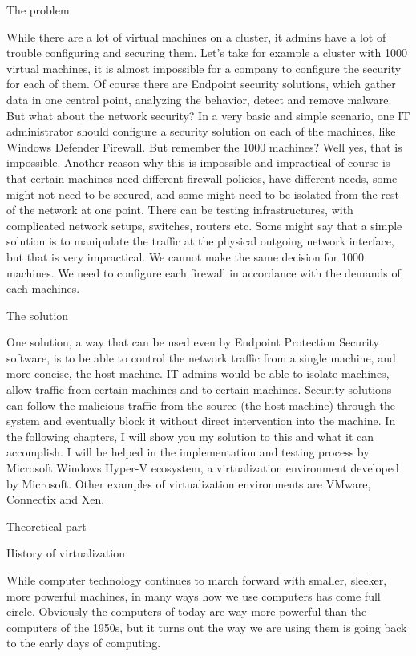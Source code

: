 \documentclass[a4paper,12pt]{report}
\begin{document}
The problem

While there are a lot of virtual machines on a cluster, it admins have a lot of trouble configuring and securing them. Let’s take for example a cluster with 1000 virtual machines, it is almost impossible for a company to configure the security for each of them. Of course there are Endpoint security solutions, which gather data in one central point, analyzing the behavior, detect and remove malware. 
But what about the network security? 
In a very basic and simple scenario, one IT administrator should configure a security solution on each of the machines, like Windows Defender Firewall. But remember the 1000 machines? Well yes, that is impossible. Another reason why this is impossible and impractical of course is that certain machines need different firewall policies, have different needs, some might not need to be secured, and some might need to be isolated from the rest of the network at one point. There can be testing infrastructures, with complicated network setups, switches, routers etc. 
Some might say that a simple solution is to manipulate the traffic at the physical outgoing network interface, but that is very impractical. We cannot make the same decision for 1000 machines. We need to configure each firewall in accordance with the demands of each machines. 

The solution

One solution, a way that can be used even by Endpoint Protection Security software, is to be able to control the network traffic from a single machine, and more concise, the host machine. IT admins would be able to isolate machines, allow traffic from certain machines and to certain machines. Security solutions can follow the malicious traffic from the source (the host machine) through the system and eventually block it without direct intervention into the machine. 
In the following chapters, I will show you my solution to this and what it can accomplish.
I will be helped in the implementation and testing process by Microsoft Windows Hyper-V ecosystem, a virtualization environment developed by Microsoft. Other examples of virtualization environments are VMware, Connectix and Xen.




Theoretical part

History of virtualization

While computer technology continues to march forward with smaller, sleeker, more
powerful machines, in many ways how we use computers has come full circle.
Obviously the computers of today are way more powerful than the computers of the
1950s, but it turns out the way we are using them is going back to the early days
of computing.
\end{document}
